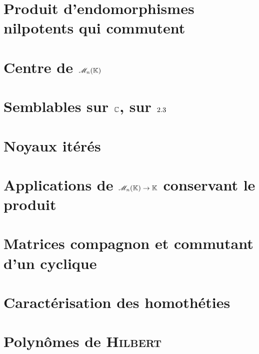 \section{Produit d'endomorphismes nilpotents qui commutent}


\section{Centre de \texorpdfstring{$\mathscr{M}_n(\mathbb{K})$}{l'espace des matrices carrées}}


\section{Semblables sur \texorpdfstring{$\mathbb{C}$, sur $2.3$}{C, sur R}}


\section{Noyaux itérés}


\section{Applications de \texorpdfstring{$\mathscr{M}_n(\mathbb{K}) \to \mathbb{K}$}{l'espace des matrices carrées dans le corps K} conservant le produit}


\section{Matrices compagnon et commutant d'un cyclique}


\section{Caractérisation des homothéties}


\section{Polynômes de \textsc{Hilbert}} \label{polynome_hilbert}


